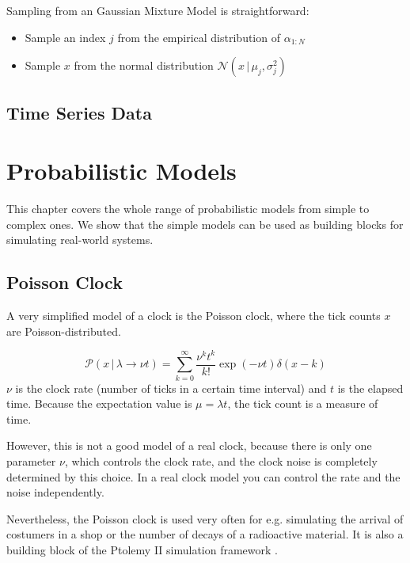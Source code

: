 \documentclass{tstextbook}
\begin{document}
Sampling from an Gaussian Mixture Model is straightforward:
\begin{itemize}
\item
Sample an index $j$ from the empirical distribution of $\alpha_{1:N}$ 
\item 
Sample $x$ from the normal distribution $\mathcal{N}\left(x\,\vert\,\mu_j,\sigma_j^2\right)$
\end{itemize}

\section{Time Series Data}

\chapter{Probabilistic Models}

\begin{summary}
  This chapter covers the whole range of probabilistic models from simple to complex ones. We show that the simple models can be used as building blocks for simulating real-world systems.
\end{summary}

\section{Poisson Clock}
A very simplified model of a clock is the Poisson clock, where the tick counts $x$ are Poisson-distributed.

\begin{definition}
  \label{th:poissonclock}
  \begin{equation}
    \mathcal{P}(x\,\vert\, \lambda\rightarrow\nu t)=\sum_{k=0}^{\infty}\frac{\nu^k t^k}{k!}\exp(-\nu t)\delta(x-k)
  \end{equation}
  $\nu$ is the clock rate (number of ticks in a certain time interval) and $t$ is the elapsed time. Because the expectation value is $\mu=\lambda t$, the tick count is a measure of time.
\end{definition}
However, this is not a good model of a real clock, because there is only one parameter $\nu$, which controls the clock rate, and the clock noise is completely determined by this choice. In a real clock model you can control the rate and the noise independently.

Nevertheless, the Poisson clock is used very often for e.g. simulating the arrival of costumers in a shop or the number of decays of a radioactive material. It is also a building block of the Ptolemy II simulation framework \cite{ptolemy2003}. 
\end{document}
